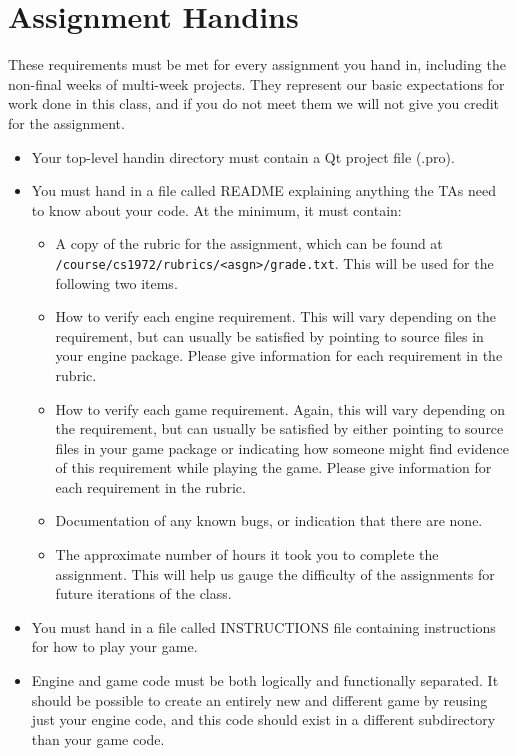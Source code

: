 \documentclass{cs1972}
\begin{document}
 \section*{Assignment Handins}
 These requirements must be met for every assignment you hand in, including the non-final weeks of multi-week projects. They represent our basic expectations for work done in this class, and if you do not meet them we will not give you credit for the assignment. 
 \begin{itemize}
  \item Your top-level handin directory must contain a Qt project file (.pro).
  \item You must hand in a file called README explaining anything the TAs need to know about your code. At the minimum, it must contain:
  \begin{itemize}
   \item A copy of the rubric for the assignment, which can be found at \newline \texttt{/course/cs1972/rubrics/<asgn>/grade.txt}. This will be used for the following two items.
   \item How to verify each engine requirement. This will vary depending on the requirement, but can usually be satisfied by pointing to source files in your engine package. Please give information for each requirement in the rubric.
   \item How to verify each game requirement. Again, this will vary depending on the requirement, but can usually be satisfied by either pointing to source files in your game package or indicating how someone might find evidence of this requirement while playing the game. Please give information for each requirement in the rubric.
   \item Documentation of any known bugs, or indication that there are none.
   \item The approximate number of hours it took you to complete the assignment. This will help us gauge the difficulty of the assignments for future iterations of the class.
  \end{itemize}
  \item You must hand in a file called INSTRUCTIONS file containing instructions for how to play your game.
  \item Engine and game code must be both logically and functionally separated. It should be possible to create an entirely new and different game by reusing just your engine code, and this code should exist in a different subdirectory than your game code.

\end{itemize}
\end{document}
